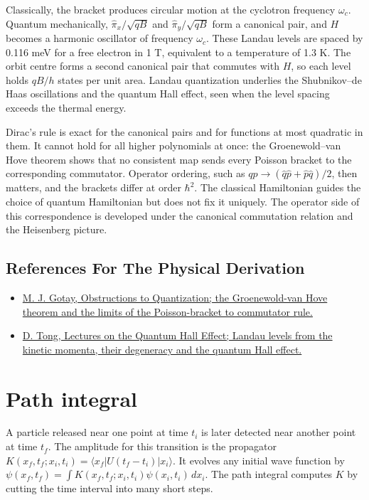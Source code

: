 \documentclass[11pt,oneside]{book}
\begin{document}
Classically, the bracket produces circular motion at the cyclotron frequency \(\omega_c\). Quantum mechanically, \(\hat\pi_x/\sqrt{qB}\) and \(\hat\pi_y/\sqrt{qB}\) form a canonical pair, and \(H\) becomes a harmonic oscillator of frequency \(\omega_c\). These Landau levels are spaced by 0.116 meV for a free electron in 1 T, equivalent to a temperature of 1.3 K. The orbit centre forms a second canonical pair that commutes with \(H\), so each level holds \(qB/h\) states per unit area. Landau quantization underlies the Shubnikov--de Haas oscillations and the quantum Hall effect, seen when the level spacing exceeds the thermal energy.

Dirac's rule is exact for the canonical pairs and for functions at most quadratic in them. It cannot hold for all higher polynomials at once: the Groenewold--van Hove theorem shows that no consistent map sends every Poisson bracket to the corresponding commutator. Operator ordering, such as \(qp\to(\hat q\hat p+\hat p\hat q)/2\), then matters, and the brackets differ at order \(\hbar^2\). The classical Hamiltonian guides the choice of quantum Hamiltonian but does not fix it uniquely. The operator side of this correspondence is developed under the canonical commutation relation and the Heisenberg picture.

\subsection*{References For The Physical Derivation}
\begin{itemize}
\item \href{https://arxiv.org/abs/math-ph/9809011}{M. J. Gotay, Obstructions to Quantization; the Groenewold-van Hove theorem and the limits of the Poisson-bracket to commutator rule.}
\item \href{https://arxiv.org/abs/1606.06687}{D. Tong, Lectures on the Quantum Hall Effect; Landau levels from the kinetic momenta, their degeneracy and the quantum Hall effect.}
\end{itemize}





\clearpage

\section{Path integral}

\label{topic:path-integral}

A particle released near one point at time \(t_i\) is later detected near another point at time \(t_f\). The amplitude for this transition is the propagator \(K(x_f,t_f;x_i,t_i)=\langle x_f|U(t_f-t_i)|x_i\rangle\). It evolves any initial wave function by \(\psi(x_f,t_f)=\int K(x_f,t_f;x_i,t_i)\psi(x_i,t_i)\,dx_i\). The path integral computes \(K\) by cutting the time interval into many short steps.
\end{document}
